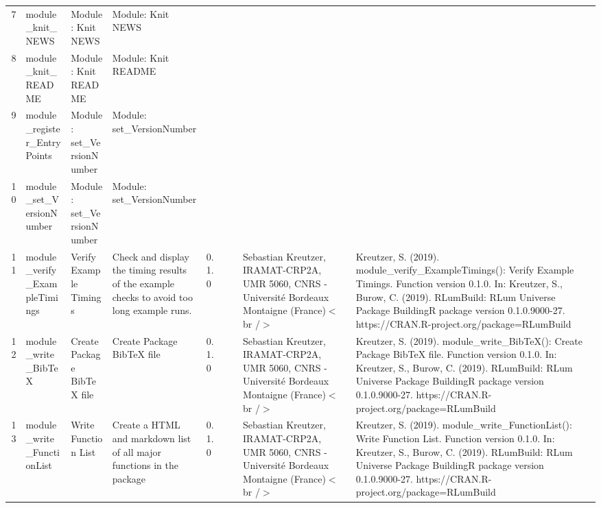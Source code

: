 \begin{table}[ht]
\begin{tabular}{rllllllll}
  7 & module\_knit\_NEWS & Module: Knit NEWS & Module: Knit NEWS &  &  &  &  &  \\ 
  8 & module\_knit\_README & Module: Knit README & Module: Knit README &  &  &  &  &  \\ 
  9 & module\_register\_EntryPoints & Module: set\_VersionNumber & Module: set\_VersionNumber &  &  &  &  &  \\ 
  10 & module\_set\_VersionNumber & Module: set\_VersionNumber & Module: set\_VersionNumber &  &  &  &  &  \\ 
  11 & module\_verify\_ExampleTimings & Verify Example Timings & Check and display the timing results of the example checks to avoid too long example runs. & 0.1.0
 &  &  & Sebastian Kreutzer, IRAMAT-CRP2A, UMR 5060, CNRS - Université Bordeaux Montaigne (France)$<$br /$>$ & Kreutzer, S. (2019). module\_verify\_ExampleTimings(): Verify Example Timings. Function version 0.1.0. In: Kreutzer, S., Burow, C. (2019). RLumBuild: RLum Universe Package BuildingR package version 0.1.0.9000-27. https://CRAN.R-project.org/package=RLumBuild
 \\ 
  12 & module\_write\_BibTeX & Create Package BibTeX file & Create Package BibTeX file & 0.1.0
 &  &  & Sebastian Kreutzer, IRAMAT-CRP2A, UMR 5060, CNRS - Université Bordeaux Montaigne (France)$<$br /$>$ & Kreutzer, S. (2019). module\_write\_BibTeX(): Create Package BibTeX file. Function version 0.1.0. In: Kreutzer, S., Burow, C. (2019). RLumBuild: RLum Universe Package BuildingR package version 0.1.0.9000-27. https://CRAN.R-project.org/package=RLumBuild
 \\ 
  13 & module\_write\_FunctionList & Write Function List & Create a HTML and markdown list of all major functions in the package & 0.1.0
 &  &  & Sebastian Kreutzer, IRAMAT-CRP2A, UMR 5060, CNRS - Université Bordeaux Montaigne (France)$<$br /$>$ & Kreutzer, S. (2019). module\_write\_FunctionList(): Write Function List. Function version 0.1.0. In: Kreutzer, S., Burow, C. (2019). RLumBuild: RLum Universe Package BuildingR package version 0.1.0.9000-27. https://CRAN.R-project.org/package=RLumBuild
 \\ 
   \hline
\end{tabular}
\end{table}

